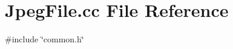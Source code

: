\section{Jpeg\+File.\+cc File Reference}
\label{JpegFile_8cc}
{\ttfamily \#include \char`\"{}common.\+h\char`\"{}}\newline

